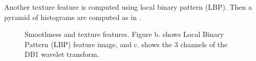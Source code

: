 \documentclass[conference,a4paper]{IEEEtran}
\begin{document}
  Another texture feature is computed using local binary pattern (LBP).  Then a pyramid of histograms are computed as in \cite{lazebnik2006beyond}.

\begin{figure}
  \centering
  \caption{
  Smoothness and texture features.  Figure b. shows Local Binary Pattern (LBP) feature image, and c. shows the 3 channels of the DB1 wavelet transform.
  }
\end{figure}
\end{document}
